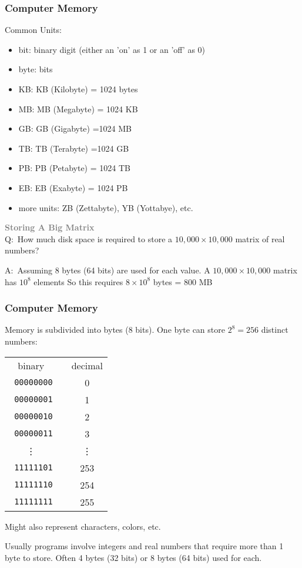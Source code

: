 \frame
{
\frametitle{Computer Memory}

Common Units:
\begin{itemize}
\item[] bit: \quad binary digit (either an 'on' as 1  or an 'off' as 0)
\item[] byte: bits
\item[] KB:  KB (Kilobyte)  = 1024 bytes
\item[] MB: MB (Megabyte) = 1024 KB
\item[] GB: GB (Gigabyte) =1024 MB
\item[] TB: TB (Terabyte) =1024 GB
\item[] PB: PB (Petabyte) = 1024 TB
\item[] EB:  EB (Exabyte) = 1024 PB
\item[] more units: \quad ZB (Zettabyte), YB (Yottabye), etc.
 \end{itemize}
\bigskip

\textcolor{gray}{\bf\large Storing A Big Matrix}\\
\medskip
Q:~How much disk space is required to store a $10, 000 \times 10, 000$ matrix of real numbers?

 A:~Assuming 8 bytes (64 bits) are used for  each value.  A $10, 000 \times 10, 000$ matrix has $10^8$ elements
  So this requires $8 \times 10^8$ bytes = 800 MB
  
}



\begin{frame}[fragile]

\frametitle{Computer Memory}

Memory is subdivided into bytes (8 bits). One byte can store   $2^8=256$ distinct numbers: 
\begin{table}[h]
\begin{center}
\begin{tabular}{ccc}
binary &  & decimal\\ 
\texttt{  00000000} &&       0\\
\texttt{  00000001} &&       1\\
\texttt{  00000010} &&       2\\
\texttt{  00000011} &&       3\\
 \vdots& & \vdots\\
\texttt{  11111101} &&     253\\
\texttt{  11111110} &&     254\\
\texttt{  11111111} &&     255\\

\end{tabular} 
\end{center}
\end{table}

Might also represent characters, colors, etc.

Usually programs involve integers and real numbers that require more than 1 byte to store.
Often 4 bytes (32 bits) or 8 bytes (64 bits) used for each.

\end{frame}

